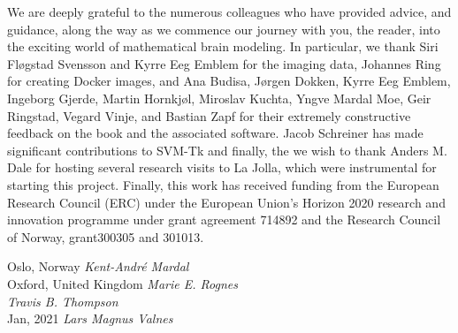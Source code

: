 We are deeply grateful to the numerous colleagues who have provided
advice, and guidance, along the way as we commence our journey with
you, the reader, into the exciting world of mathematical brain
modeling. In particular, we thank Siri Fl\o gstad Svensson and Kyrre
Eeg Emblem for the imaging data, Johannes Ring for creating Docker
images, and Ana Budisa, J\o rgen Dokken, Kyrre Eeg Emblem, Ingeborg
Gjerde, Martin Hornkj\o l, Miroslav Kuchta, Yngve Mardal Moe, Geir
Ringstad, Vegard Vinje, and Bastian Zapf for their extremely
constructive feedback on the book and the associated software.  Jacob
Schreiner has made significant contributions to SVM-Tk and finally,
the we wish to thank Anders M. Dale for hosting several research
visits to La Jolla, which were instrumental for starting this project.
Finally, this work has received funding from the European Research 
Council (ERC) under the European Union's Horizon 2020 research and 
innovation programme under grant agreement 714892 
and the Research Council of Norway, grant300305 and 301013. 


\vspace{\baselineskip}
\begin{flushright}\noindent
Oslo, Norway \hfill {\it Kent-Andr\'e Mardal}\\ 
Oxford, United Kingdom   \hfill {\it Marie E. Rognes}\\ 
             \hfill {\it Travis B. Thompson}\\ 
Jan, 2021    \hfill {\it Lars Magnus Valnes}\\ 
\end{flushright}


